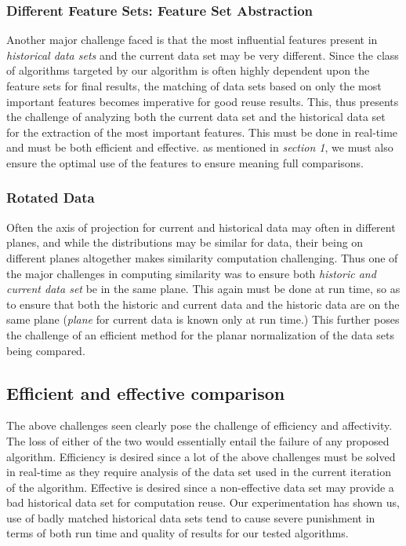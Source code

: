 \documentclass{vldb}
\begin{document}
\subsubsection{Different Feature Sets: Feature Set Abstraction}
Another major challenge faced is that the most influential features present in \textit{historical data sets} and the current data set may be very different. Since the class of algorithms targeted by our algorithm is often highly dependent upon the feature sets for final results, the matching of data sets based on only the most important features becomes imperative for good reuse results. This, thus presents the challenge of analyzing both the current data set and the historical data set for the extraction of the most important features. This must be done in real-time and must be both efficient and effective. as mentioned in \textit{section 1}, we must also ensure the optimal use of the features to ensure meaning full comparisons.
\subsubsection{Rotated Data}
Often the axis of projection for current and historical data may often in different planes, and while the distributions may be similar for data, their being on different planes altogether makes similarity computation challenging. Thus one of the major challenges in computing similarity was to ensure both \textit{historic and current data set} be in the same plane. This again must be done at run time, so as to ensure that both the historic and current data and the historic data are on the same plane (\textit{plane} for current data is known only at run time.) This further poses the challenge of an efficient method for the planar normalization of the data sets being compared.
\subsection{Efficient and effective comparison}
The above challenges seen clearly pose the challenge of efficiency and affectivity. The loss of either of the two would essentially entail the failure of any proposed algorithm.
Efficiency is desired since a lot of the above challenges must be solved in real-time as they require analysis of the data set used in the current iteration of the algorithm.
Effective is desired since a non-effective data set may provide a bad historical data set for computation reuse. Our experimentation has shown us, use of badly matched historical data sets tend to cause severe punishment in terms of both run time and quality of results for our tested algorithms.
\end{document}
